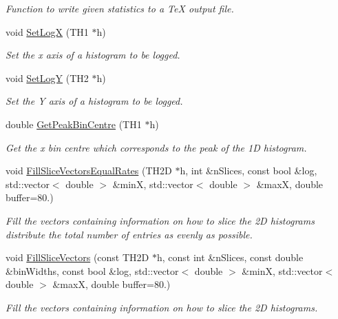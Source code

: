 \begin{DoxyCompactItemize}
\begin{DoxyCompactList}\small\item\em Function to write given statistics to a Te\-X output file. \end{DoxyCompactList}\item 
void \hyperlink{namespacecalib_ac9f07c3037f98888a6042f4aaec39038}{Set\-Log\-X} (T\-H1 $\ast$h)
\begin{DoxyCompactList}\small\item\em Set the x axis of a histogram to be logged. \end{DoxyCompactList}\item 
void \hyperlink{namespacecalib_ae369ae0c95b3326a3dea5f812058bebe}{Set\-Log\-Y} (T\-H2 $\ast$h)
\begin{DoxyCompactList}\small\item\em Set the Y axis of a histogram to be logged. \end{DoxyCompactList}\item 
double \hyperlink{namespacecalib_a60a5ea8e534e449cc2daa4dce2b570cb}{Get\-Peak\-Bin\-Centre} (T\-H1 $\ast$h)
\begin{DoxyCompactList}\small\item\em Get the x bin centre which corresponds to the peak of the 1\-D histogram. \end{DoxyCompactList}\item 
void \hyperlink{namespacecalib_ab7394e2ac9ddb0399fd7887f91fe3473}{Fill\-Slice\-Vectors\-Equal\-Rates} (T\-H2\-D $\ast$h, int \&n\-Slices, const bool \&log, std\-::vector$<$ double $>$ \&min\-X, std\-::vector$<$ double $>$ \&max\-X, double buffer=80.)
\begin{DoxyCompactList}\small\item\em Fill the vectors containing information on how to slice the 2\-D histograms distribute the total number of entries as evenly as possible. \end{DoxyCompactList}\item 
void \hyperlink{namespacecalib_ae7237c68dfcaaaa495f89fb810364229}{Fill\-Slice\-Vectors} (const T\-H2\-D $\ast$h, const int \&n\-Slices, const double \&bin\-Widths, const bool \&log, std\-::vector$<$ double $>$ \&min\-X, std\-::vector$<$ double $>$ \&max\-X, double buffer=80.)
\begin{DoxyCompactList}\small\item\em Fill the vectors containing information on how to slice the 2\-D histograms. \end{DoxyCompactList}\item 

\end{DoxyCompactItemize}
